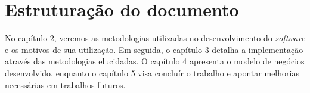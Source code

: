 \section{Estruturação do documento}

No capítulo 2, veremos as metodologias utilizadas no desenvolvimento do \textit{software} e os motivos de sua utilização. Em seguida, o capítulo 3 detalha a implementação através das metodologias elucidadas. O capítulo 4 apresenta o modelo de negócios desenvolvido, enquanto o capítulo 5 visa concluír o trabalho e apontar melhorias necessárias em trabalhos futuros.